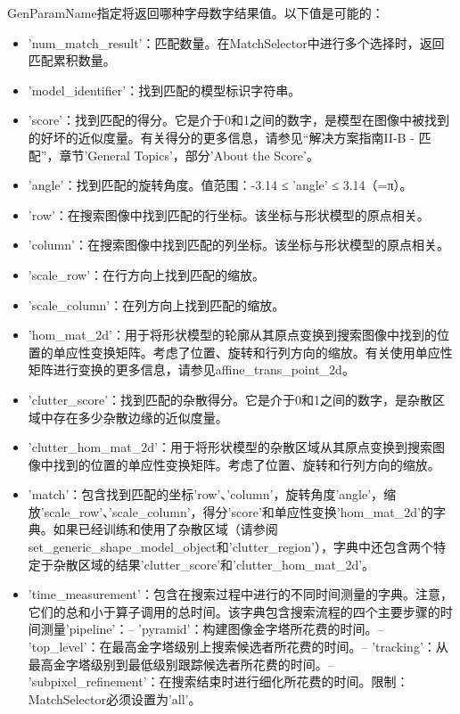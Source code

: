 \documentclass{article}
\begin{document}
GenParamName指定将返回哪种字母数字结果值。以下值是可能的：
\begin{itemize}

	\item 'num\_match\_result'：匹配数量。在MatchSelector中进行多个选择时，返回匹配累积数量。
	\item 'model\_identifier'：找到匹配的模型标识字符串。

	\item 'score'：找到匹配的得分。它是介于0和1之间的数字，是模型在图像中被找到的好坏的近似度量。有关得分的更多信息，请参见“解决方案指南II-B - 匹配”，章节'General Topics'，部分'About the Score'。

	\item 'angle'：找到匹配的旋转角度。值范围：-3.14 ≤ 'angle' ≤ 3.14（=π）。

	\item 'row'：在搜索图像中找到匹配的行坐标。该坐标与形状模型的原点相关。

	\item 'column'：在搜索图像中找到匹配的列坐标。该坐标与形状模型的原点相关。

	\item 'scale\_row'：在行方向上找到匹配的缩放。

	\item 'scale\_column'：在列方向上找到匹配的缩放。

	\item 'hom\_mat\_2d'：用于将形状模型的轮廓从其原点变换到搜索图像中找到的位置的单应性变换矩阵。考虑了位置、旋转和行列方向的缩放。有关使用单应性矩阵进行变换的更多信息，请参见affine\_trans\_point\_2d。

	\item 'clutter\_score'：找到匹配的杂散得分。它是介于0和1之间的数字，是杂散区域中存在多少杂散边缘的近似度量。

	\item 'clutter\_hom\_mat\_2d'：用于将形状模型的杂散区域从其原点变换到搜索图像中找到的位置的单应性变换矩阵。考虑了位置、旋转和行列方向的缩放。

	\item 'match'：包含找到匹配的坐标'row'、'column'，旋转角度'angle'，缩放'scale\_row'、'scale\_column'，得分'score'和单应性变换'hom\_mat\_2d'的字典。如果已经训练和使用了杂散区域（请参阅set\_generic\_shape\_model\_object和'clutter\_region'），字典中还包含两个特定于杂散区域的结果'clutter\_score'和'clutter\_hom\_mat\_2d'。

	\item 'time\_measurement'：包含在搜索过程中进行的不同时间测量的字典。注意，它们的总和小于算子调用的总时间。该字典包含搜索流程的四个主要步骤的时间测量'pipeline'：– 'pyramid'：构建图像金字塔所花费的时间。– 'top\_level'：在最高金字塔级别上搜索候选者所花费的时间。– 'tracking'：从最高金字塔级别到最低级别跟踪候选者所花费的时间。– 'subpixel\_refinement'：在搜索结束时进行细化所花费的时间。限制：MatchSelector必须设置为'all'。

\end{itemize}
\end{document}

